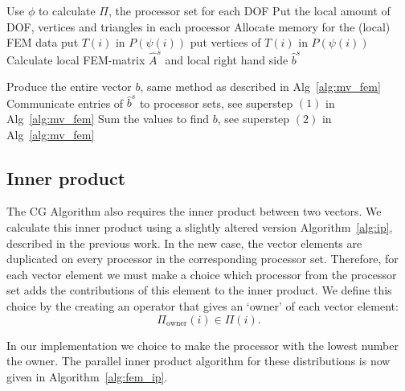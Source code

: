 \documentclass[11pt]{amsart}
\theoremstyle{definition}
\begin{document}
\begin{algorithm}[H]
	 {
		Use $\phi$ to calculate $\Pi$, the processor set for each DOF\; 
		Put the local amount of DOF, vertices and triangles in each processor\;
	}
	Allocate memory for the (local) FEM data\;
	 {
		 {
			put $T(i)$ in $P(\psi(i))$\;
			put vertices of $T(i)$ in $P(\psi(i))$ 
		}
	}
	Calculate local FEM-matrix $\hat A^s$ and local right hand side $\hat b^s$\;
	
  { Produce the entire vector $b$, same method as described in Alg~\ref{alg:mv_fem} }
	Communicate entries of $\hat b^s$ to processor sets, see superstep $(1)$ in Alg~\ref{alg:mv_fem}\;
	Sum the values to find $b$, see superstep $(2)$ in Alg~\ref{alg:mv_fem}\;
 \caption{Algorithm that calculates the local FEM data.}
 \label{alg:init_fem}
\end{algorithm}

\subsection{Inner product}
The CG Algorithm also requires the inner product between two vectors. We calculate this inner product using a slightly altered version Algorithm~\ref{alg:ip}, described in the previous work. In the new case, the vector elements are duplicated on every processor in the corresponding processor set. Therefore, for each vector element we must make a choice which processor from the processor set adds the contributions of this element to the inner product. We define this choice by the creating an operator that gives an `owner' of each vector element:
\[
	\Pi_{\text{owner}}(i) \in \Pi(i).
\]

In our implementation we choice to make the processor with the lowest number the owner. The parallel inner product algorithm for these distributions is now given in Algorithm~\ref{alg:fem_ip}.
\end{document}
